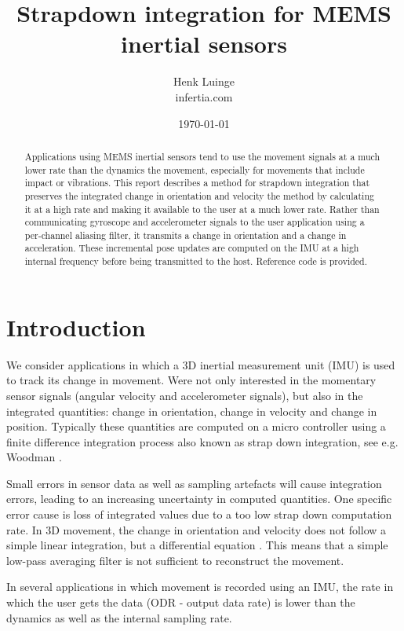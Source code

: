 \documentclass{article}
\title{Strapdown integration for MEMS inertial sensors}
\author{Henk Luinge  \\
	infertia.com   \\
	}
\date{\today}
\begin{document}
\maketitle

\begin{abstract}
Applications using MEMS inertial sensors tend to use the movement signals at a much lower rate than the dynamics the movement, especially for movements that include impact or vibrations. This report describes a method for strapdown integration that preserves the integrated change in orientation and velocity the method by calculating it at a high rate and making it available to the user at a much lower rate. Rather than communicating gyroscope and accelerometer signals to the user application using a per-channel aliasing filter, it transmits a change in orientation and a change in acceleration. These incremental pose updates are computed on the IMU at a high internal frequency before being transmitted to the host. Reference code is provided.
\end{abstract}

\section{Introduction}


We consider applications in which a 3D inertial measurement unit (IMU) is used to track its change in movement. Were not only interested in the momentary sensor signals (angular velocity and accelerometer signals), but also in the integrated quantities: change in orientation, change in velocity and change in position. Typically these quantities are computed on a micro controller using a finite difference integration process also known as strap down integration, see e.g. Woodman \cite{Woodman2007AnIT}.

Small errors in sensor data as well as sampling artefacts will cause integration errors, leading to an increasing uncertainty in computed quantities. One specific error cause is loss of integrated values due to a too low strap down computation rate. In 3D movement, the change in orientation and velocity does not follow a simple linear integration, but a differential equation \cite{Bortz1970}. This means that a simple low-pass averaging filter is not sufficient to reconstruct the movement. 

In several applications in which movement is recorded using an IMU, the rate in which the user gets the data (ODR - output data rate) is lower than the dynamics as well as the internal sampling rate. 
\end{document}
